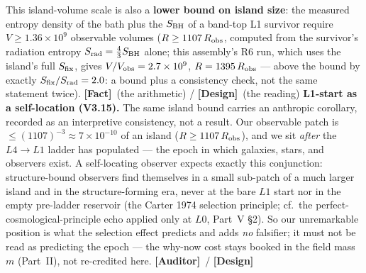 \documentclass[11pt]{article}
\newcommand{\Fact}{\textbf{\textcolor{green!45!black}{[Fact]}}}
\newcommand{\Auditor}{\textbf{\textcolor{teal!55!black}{[Auditor]}}}
\newcommand{\design}{\textcolor{blue!60!black}{\textbf{[Design]}}}
\begin{document}
This island-volume scale is also a \textbf{lower bound on island size}: the measured entropy density of the bath plus the $S_{\rm BH}$ of a band-top L1 survivor require $V\ge1.36\times10^{9}$ observable volumes ($R\ge1107\,R_{\rm obs}$, computed from the survivor's radiation entropy $S_{\rm rad}=\tfrac{4}{3}S_{\rm BH}$ alone; this assembly's R6 run, which uses the island's full $S_{\rm fix}$, gives $V/V_{\rm obs}=2.7\times10^{9}$, $R=1395\,R_{\rm obs}$ --- above the bound by exactly $S_{\rm fix}/S_{\rm rad}=2.0$: a bound plus a consistency check, not the same statement twice). \Fact\ (the arithmetic) / \design\ (the reading) \textbf{L1-start as a self-location (V3.15).} The same island bound carries an anthropic corollary, recorded as an interpretive consistency, not a result. Our observable patch is $\le(1107)^{-3}\approx7\times10^{-10}$ of an island ($R\ge1107\,R_{\rm obs}$), and we sit \emph{after} the $L4\to L1$ ladder has populated --- the epoch in which galaxies, stars, and observers exist. A self-locating observer expects exactly this conjunction: structure-bound observers find themselves in a small sub-patch of a much larger island and in the structure-forming era, never at the bare $L1$ start nor in the empty pre-ladder reservoir (the Carter 1974 selection principle; cf.\ the perfect-cosmological-principle echo applied only at $L0$, Part~V \S2). So our unremarkable position is what the selection effect predicts and adds \emph{no} falsifier; it must not be read as predicting the epoch --- the why-now cost stays booked in the field mass $m$ (Part~II), not re-credited here. \Auditor\ / \design

\end{document}
